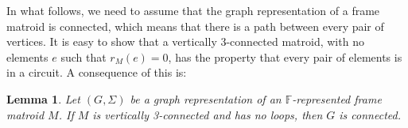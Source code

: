 \documentclass[12pt]{amsart}
\newtheorem{lemma}[theorem]{Lemma}
\theoremstyle{definition}
\newcommand{\bF}{\mathbb F}
\DeclareMathOperator{\GF}{GF}
\begin{document}
   
   
   In what follows, we need to assume that the graph representation of a frame matroid is connected, which means that there is a path between every pair of vertices. It is easy to show that a vertically $3$-connected matroid, with no elements $e$ such that $r_M(e) = 0$, has the property that every pair of elements is in a circuit. A consequence of this is:

   \begin{lemma}\label{lem:graphconn}
     Let $(G,\Sigma)$ be a graph representation of an $\bF$-represented frame matroid $M$. If $M$ is vertically 3-connected and has no loops, then $G$ is connected.
   \end{lemma}
\end{document}

